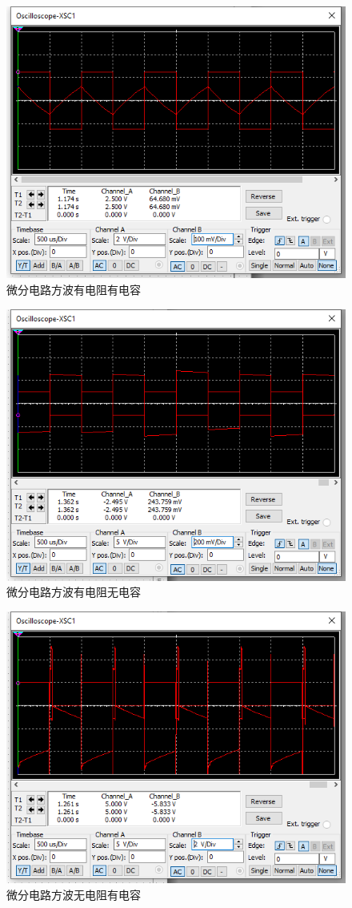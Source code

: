 \documentclass{ctexart}
\begin{document}


\begin{figure}[H]
  \centering
  \includegraphics[width=0.75\linewidth]{电路设计/微分电路/微分电路方波有电阻有电容.png}
  \caption{微分电路方波有电阻有电容}
\end{figure}

\begin{figure}[H]
  \centering
  \includegraphics[width=0.75\linewidth]{电路设计/微分电路/微分电路方波有电阻无电容.png}
  \caption{微分电路方波有电阻无电容}
\end{figure}

\begin{figure}[H]
  \centering
  \includegraphics[width=0.75\linewidth]{电路设计/微分电路/微分电路方波无电阻有电容.png}
  \caption{微分电路方波无电阻有电容}
\end{figure}
\end{document}

